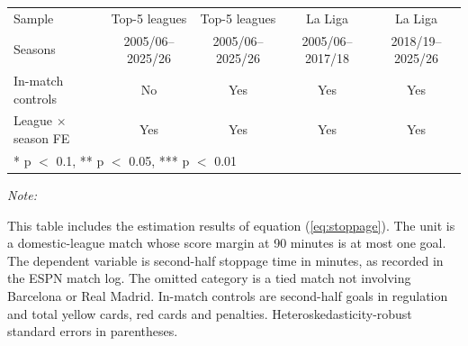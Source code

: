 \begin{table}[!h]
{\begin{threeparttable}
\begin{tabular}[t]{lcccc}
Sample & Top-5 leagues & Top-5 leagues & La Liga & La Liga\\
Seasons & 2005/06--2025/26 & 2005/06--2025/26 & 2005/06--2017/18 & 2018/19--2025/26\\
In-match controls & No & Yes & Yes & Yes\\
League $\times$ season FE & Yes & Yes & Yes & Yes\\
\bottomrule
\multicolumn{5}{l}{\rule{0pt}{1em}* p $<$ 0.1, ** p $<$ 0.05, *** p $<$ 0.01}\\
\end{tabular}
\begin{tablenotes}[para]
\item \textit{Note: } 
\item This table includes the estimation results of equation (\ref{eq:stoppage}). The unit is a domestic-league match whose score margin at 90 minutes is at most one goal. The dependent variable is second-half stoppage time in minutes, as recorded in the ESPN match log. The omitted category is a tied match not involving Barcelona or Real Madrid. In-match controls are second-half goals in regulation and total yellow cards, red cards and penalties. Heteroskedasticity-robust standard errors in parentheses.
\end{tablenotes}
\end{threeparttable}}
\end{table}
